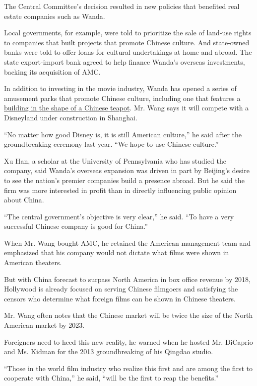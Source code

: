 The Central Committee's decision resulted in new policies that benefited
real estate companies such as Wanda.

Local governments, for example, were told to prioritize the sale of
land-use rights to companies that built projects that promote Chinese
culture. And state-owned banks were told to offer loans for cultural
undertakings at home and abroad. The state export-import bank agreed to
help finance Wanda's overseas investments, backing its acquisition of
AMC.

In addition to investing in the movie industry, Wanda has opened a
series of amusement parks that promote Chinese culture, including one
that features a
\href{http://news.xinhuanet.com/house/wuxi/2014-02-28/c_119549270.htm}{building
in the shape of a Chinese teapot}. Mr. Wang says it will compete with a
Disneyland under construction in Shanghai.

``No matter how good Disney is, it is still American culture,'' he said
after the groundbreaking ceremony last year. ``We hope to use Chinese
culture.''

Xu Han, a scholar at the University of Pennsylvania who has studied the
company, said Wanda's overseas expansion was driven in part by Beijing's
desire to see the nation's premier companies build a presence abroad.
But he said the firm was more interested in profit than in directly
influencing public opinion about China.

``The central government's objective is very clear,'' he said. ``To have
a very successful Chinese company is good for China.''

When Mr. Wang bought AMC, he retained the American management team and
emphasized that his company would not dictate what films were shown in
American theaters.

But with China forecast to surpass North America in box office revenue
by 2018, Hollywood is already focused on serving Chinese filmgoers and
satisfying the censors who determine what foreign films can be shown in
Chinese theaters.

Mr. Wang often notes that the Chinese market will be twice the size of
the North American market by 2023.

Foreigners need to heed this new reality, he warned when he hosted Mr.
DiCaprio and Ms. Kidman for the 2013 groundbreaking of his Qingdao
studio.

``Those in the world film industry who realize this first and are among
the first to cooperate with China,'' he said, ``will be the first to
reap the benefits.''

